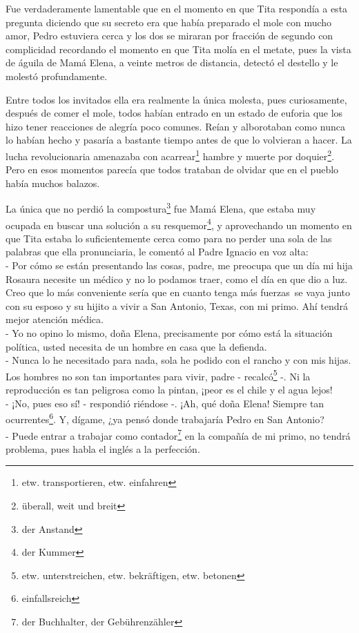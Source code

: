 Fue verdaderamente lamentable que en el momento en que Tita respondía a
esta pregunta diciendo que su secreto era que había preparado el mole
con mucho amor, Pedro estuviera cerca y los dos se miraran por fracción
de segundo con complicidad recordando el momento en que Tita molía en el
metate, pues la vista de águila de Mamá Elena, a veinte metros de distancia,
detectó el destello y le molestó profundamente.

Entre todos los invitados ella era realmente la única molesta, pues
curiosamente, después de comer el mole, todos habían entrado en un
estado de euforia que los hizo tener reacciones de alegría poco comunes.
Reían y alborotaban como nunca lo habían hecho y pasaría a bastante
tiempo antes de que lo volvieran a hacer. La lucha revolucionaria
amenazaba con acarrear\footnote{etw. transportieren, etw. einfahren}
hambre y muerte por doquier\footnote{überall, weit und breit}.
Pero en esos momentos parecía que todos trataban de olvidar que en el
pueblo había muchos balazos.

La única que no perdió la compostura\footnote{der Anstand}
fue Mamá Elena, que estaba muy ocupada en buscar una solución a su resquemor\footnote{der Kummer}, y aprovechando un momento
en que Tita estaba lo suficientemente cerca como para no perder una sola
de las palabras que ella pronunciaria, le comentó al Padre Ignacio en
voz alta:
\\- Por cómo se están presentando las cosas, padre, me preocupa que un día %
mi hija Rosaura necesite un médico y no lo podamos traer, como el día en %
que dio a luz. Creo que lo más conveniente sería que en cuanto tenga más %
fuerzas~se vaya junto con su esposo y su hijito a vivir a San %
Antonio, Texas, con mi primo. Ahí tendrá mejor atención médica. %
\\- Yo no opino lo mismo, doña Elena, precisamente por cómo está la %
situación política, usted necesita de un hombre en casa que la defienda. %
\\- Nunca lo he necesitado para nada, sola he podido con el rancho y con %
mis hijas. Los hombres no son tan importantes para vivir, padre - recalcó\footnote{etw. unterstreichen, etw. bekräftigen, etw. betonen} -. Ni %
la reproducción es tan peligrosa como la pintan, ¡peor es %
el chile y el agua lejos! %
\\- ¡No, pues eso sí! - respondió riéndose -. ¡Ah, qué doña Elena! Siempre %
tan ocurrentes\footnote{einfallsreich}. Y, dígame, ¿ya pensó donde %
trabajaría Pedro en San Antonio? %
\\- Puede entrar a trabajar como contador\footnote{der Buchhalter, der Gebührenzähler} %
en la compañía de mi primo, no tendrá problema, pues habla el inglés a %
la perfección.\\


